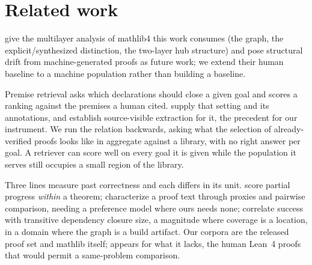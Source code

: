 
\section{Related work}
\label{sec:related}

\citet{li2026network} give the multilayer analysis of mathlib4 this work
consumes (the graph, the explicit/synthesized distinction, the two-layer hub
structure) and pose structural drift from machine-generated proofs as future
work; we extend their human baseline to a machine population rather than building a
baseline.

Premise retrieval asks which declarations should close a given goal and scores
a ranking against the premises a human cited. \citet{leandojo} supply that
setting and its annotations, and \citet{cslibpremise} establish source-visible
extraction for it, the precedent for our instrument. We run the relation
backwards, asking what the selection of already-verified proofs looks like in
aggregate against a library, with no right answer per goal. A retriever can
score well on every goal it is given while the population it serves still
occupies a small region of the library.

Three lines measure past correctness and each differs in its unit.
\citet{theorembench} score partial progress \emph{within} a theorem;
\citet{proofrank} characterize a proof text through proxies and pairwise
comparison, needing a preference model where ours needs none;
\citet{verisoftbench} correlate success with transitive dependency closure
size, a magnitude where coverage is a location, in a domain where the graph is
a build artifact. Our corpora are the released \citet{goedelprover} proof set
and mathlib itself; \citet{minif2f} appears for what it lacks, the human Lean~4
proofs that would permit a same-problem comparison.
